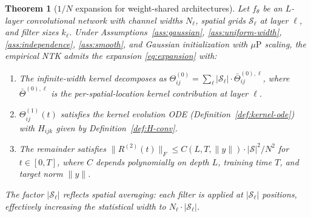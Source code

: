 \documentclass[11pt]{article}
\newtheorem{theorem}{Theorem}[section]
\theoremstyle{definition}
\newcommand{\cS}{\mathcal{S}}
\newcommand{\muP}{\mu\text{P}}
\newcommand{\norm}[1]{\lVert #1 \rVert}
\renewcommand{\Theta}{\varTheta}
\begin{document}
\begin{theorem}[$1/N$ expansion for weight-shared architectures]
\label{thm:expansion}
Let $f_\theta$ be an $L$-layer convolutional network with channel widths $N_\ell$, spatial grids $\cS_\ell$ at layer $\ell$, and filter sizes $k_\ell$. Under Assumptions~\ref{ass:gaussian}, \ref{ass:uniform-width}, \ref{ass:independence}, \ref{ass:smooth}, and Gaussian initialization with $\muP$ scaling, the empirical NTK admits the expansion \eqref{eq:expansion} with:
\begin{enumerate}[label=(\roman*)]
\item The infinite-width kernel decomposes as $\Theta^{(0)}_{ij} = \sum_\ell |\cS_\ell| \cdot \bar{\Theta}^{(0),\ell}_{ij}$, where $\bar{\Theta}^{(0),\ell}$ is the per-spatial-location kernel contribution at layer $\ell$.
\item $\Theta^{(1)}_{ij}(t)$ satisfies the kernel evolution ODE (Definition~\ref{def:kernel-ode}) with $H_{ijk}$ given by Definition~\ref{def:H-conv}.
\item The remainder satisfies $\norm{R^{(2)}(t)}_F \le C(L, T, \norm{y}) \cdot |\cS|^2 / N^2$ for $t \in [0, T]$, where $C$ depends polynomially on depth $L$, training time $T$, and target norm $\norm{y}$.
\end{enumerate}
The factor $|\cS_\ell|$ reflects spatial averaging: each filter is applied at $|\cS_\ell|$ positions, effectively increasing the statistical width to $N_\ell \cdot |\cS_\ell|$.
\end{theorem}
\end{document}
